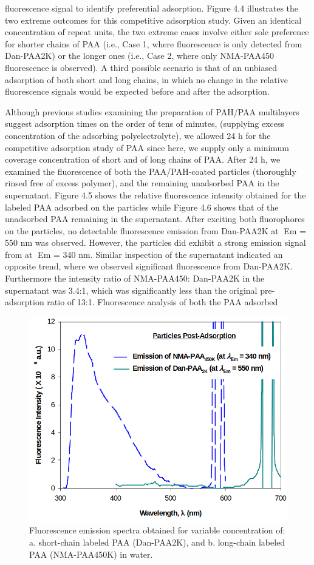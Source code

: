 \documentclass[journal=jacsat,manuscript=article]{achemso}
\begin{document}
fluorescence signal to identify preferential adsorption.  Figure 4.4 illustrates the two extreme outcomes for this competitive adsorption study.  Given an identical concentration of repeat units, the two extreme cases involve either sole preference for shorter chains of PAA (i.e., Case 1, where fluorescence is only detected from Dan-PAA2K) or the longer ones (i.e., Case 2, where only NMA-PAA450 fluorescence is observed).  A third possible scenario is that of an unbiased adsorption of both short and long chains, in which no change in the relative fluorescence signals would be expected before and after the adsorption. 

Although previous studies examining the preparation of PAH/PAA multilayers suggest adsorption times on the order of tens of minutes, (supplying excess concentration of the adsorbing polyelectrolyte), we allowed 24 h for the competitive adsorption study of PAA since here, we supply only a minimum coverage concentration of short and of long chains of PAA.  After 24 h, we examined the fluorescence of both the PAA/PAH-coated particles (thoroughly rinsed free of excess polymer), and the remaining unadsorbed PAA in the supernatant.  Figure 4.5 shows the relative fluorescence intensity obtained for the labeled PAA adsorbed on the particles while Figure 4.6 shows that of the unadsorbed PAA remaining in the supernatant.  After exciting both fluorophores on the particles, no detectable fluorescence emission from Dan-PAA2K at Em = 550 nm was observed.  However, the particles did exhibit a strong emission signal from at Em = 340 nm.  Similar inspection of the supernatant indicated an opposite trend, where we observed significant fluorescence from Dan-PAA2K.  Furthermore the intensity ratio of NMA-PAA450: Dan-PAA2K in the supernatant was 3.4:1, which was significantly less than the original pre-adsorption ratio of 13:1.  Fluorescence analysis of both the PAA adsorbed 


\begin{figure}[H]
\includegraphics[scale=1.75]{fig5.png}
\caption{Fluorescence emission spectra obtained for variable concentration of: a. short-chain labeled PAA (Dan-PAA2K), and b. long-chain labeled PAA (NMA-PAA450K) in water.}
\label{figure 5}
\end{figure}
\end{document}
